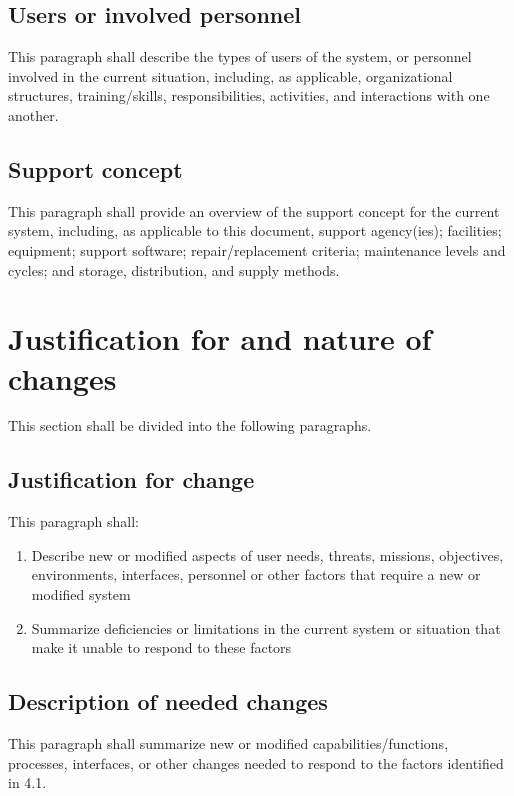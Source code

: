 \subsection{Users or involved personnel}

This paragraph shall describe the types of users of the system, or
personnel involved in the current situation, including, as applicable,
organizational structures, training/skills, responsibilities,
activities, and interactions with one another.

\subsection{Support concept}

This paragraph shall provide an overview of the support concept for the
current system, including, as applicable to this document, support
agency(ies); facilities; equipment; support software; repair/replacement
criteria; maintenance levels and cycles; and storage, distribution, and
supply methods.

\section{Justification for and nature of changes}

This section shall be divided into the following paragraphs.

\subsection{Justification for change}

This paragraph shall:

\begin{enumerate}
\itemsep1pt\parskip0pt
\item
  Describe new or modified aspects of user needs, threats, missions,
  objectives, environments, interfaces, personnel or other factors that
  require a new or modified system
\item
  Summarize deficiencies or limitations in the current system or
  situation that make it unable to respond to these factors
\end{enumerate}

\subsection{Description of needed changes}

This paragraph shall summarize new or modified capabilities/functions,
processes, interfaces, or other changes needed to respond to the factors
identified in 4.1.

